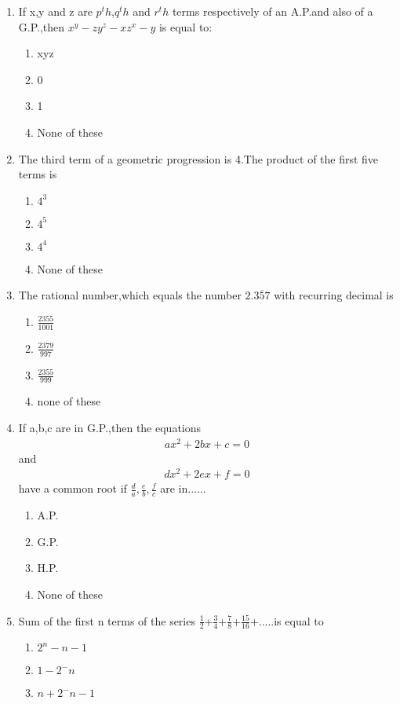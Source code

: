 \begin{enumerate}[label=\arabic*.,ref=\thesubsection.\theenumi]
 \item If x,y and z are $p^th$,$q^th$ and $r^th$ terms respectively of an A.P.and also of a G.P.,then $x^y-z y^z-x z^x-y$ is equal to:
 \begin{enumerate}
 \item xyz 
 \item 0 
 \item 1 
 \item None of these
 \end{enumerate}
\item The third term of a geometric progression is 4.The product of the first five terms is 
\begin{enumerate}
 \item $4^3$ 
 \item $4^5$
 \item $4^4$
 \item None of these
 \end{enumerate}
 \item The rational number,which equals the number $2.\overline{357}$ with recurring decimal is
 \begin{enumerate}
 \item $\frac{2355}{1001}$ 
\item  $\frac{2379}{997}$ 
 \item $\frac{2355}{999}$
 \item none of these
 \end{enumerate}
 \item If a,b,c are in G.P.,then the equations
  \begin{align}
  ax^2+2bx+c=0
  \end{align} and  
  \begin{align}
  dx^2+2ex+f=0
  \end{align} have a common root if $\frac{d}{a}, \frac{e}{b}, \frac{f}{c}$ are in......
  \begin{enumerate}
  \item A.P. 
  \item G.P. 
  \item H.P. 
  \item None of these
 \end{enumerate}
  \item Sum of the first n terms of the series $\frac{1}{2}$+$\frac{3}{4}$+$\frac{7}{8}$+$\frac{15}{16}$+.....is equal to 
   \begin{enumerate}
 \item  $2^n-n-1$ 
 \item $1-2^-n$
 \item  $n+2^-n-1$

\end{enumerate}
\end{enumerate}
